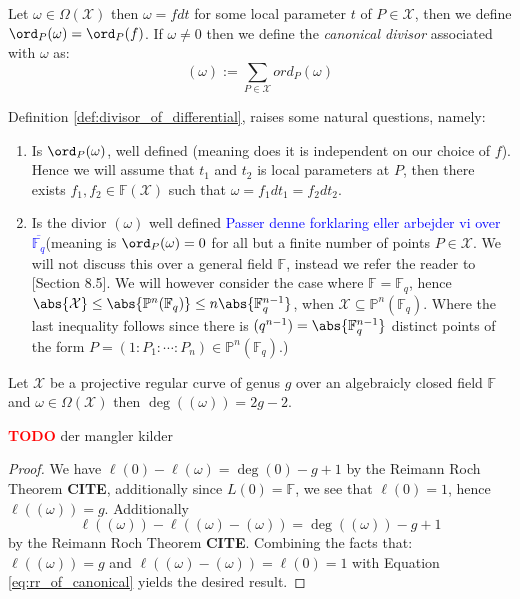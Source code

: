 
\begin{definition}\label{def:divisor_of_differential}
  Let $\omega \in \Omega(\mathcal{X})$ then $\omega = f dt$ for some local parameter $t$ of $P \in \mathcal{X}$, then we define $\ord_P(\omega) = \ord_P(f)$. If $\omega \neq 0$ then we define the \textit{canonical divisor} associated with $\omega$ as:
  \begin{equation*}
    (\omega) := \sum_{P \in \mathcal{X}} ord_P(\omega)
  \end{equation*}
\end{definition}
Definition \ref{def:divisor_of_differential}, raises some natural questions, namely:
\begin{enumerate}
  \item Is $\ord_P(\omega)$, well defined (meaning does it is independent on our choice of $f$). Hence we will assume that $t_1$ and $t_2$ is local parameters at $P$, then there exists $f_1, f_2 \in \mathbb{F}(\mathcal{X})$ such that $\omega = f_1 dt_1 = f_2 dt_2$.
  \item Is the divior $(\omega)$ well defined \textcolor{blue}{Passer denne forklaring eller arbejder vi over $\overline{\mathbb{F}_{q}}$}(meaning is $\ord_P(\omega) = 0$ for all but a finite number of points $P \in \mathcal{X}$. We will not discuss this over a general field $\mathbb{F}$, instead we refer the reader to \cite{Fulton}[Section 8.5]. We will however consider the case where $\mathbb{F} = \mathbb{F}_q$, hence $\abs{\mathcal{X}} \leq \abs{\mathbb{P}^n(\mathbb{F}_q)} \leq n \abs{\mathbb{F}_q^{n - 1}}$, when $\mathcal{X} \subseteq \mathbb{P}^n(\mathbb{F}_q)$. Where the last inequality follows since there is $(q^{n - 1}) = \abs{\mathbb{F}_q^{n - 1}}$ distinct points of the form $P = (1 : P_1 : \cdots :  P_{n}) \in \mathbb{P}^n(\mathbb{F}_q)$.)
\end{enumerate}

\begin{proposition}\label{prop:degree_of_canonical_divisor}
  Let $\mathcal{X}$ be a projective regular curve of genus $g$ over an algebraicly closed field $\mathbb{F}$ and $\omega \in \Omega(\mathcal{X})$ then $\deg((\omega)) = 2g - 2$.
\end{proposition}
\textcolor{red}{\textbf{TODO}} der mangler kilder
\begin{proof}
  We have $\ell(0) - \ell(\omega) = \deg(0) - g + 1$ by the Reimann Roch Theorem \textbf{CITE}, additionally since $L(0) = \mathbb{F}$, we see that $\ell(0) = 1$, hence $\ell((\omega)) = g$. Additionally
  \begin{equation}\label{eq:rr_of_canonical}
    \ell((\omega)) - \ell((\omega) - (\omega)) = \deg((\omega)) - g + 1
  \end{equation}
  by the Reimann Roch Theorem \textbf{CITE}. Combining the facts that: $\ell((\omega)) = g$ and $\ell((\omega) - (\omega)) = \ell(0) = 1$ with Equation \eqref{eq:rr_of_canonical} yields the desired result.
\end{proof}

